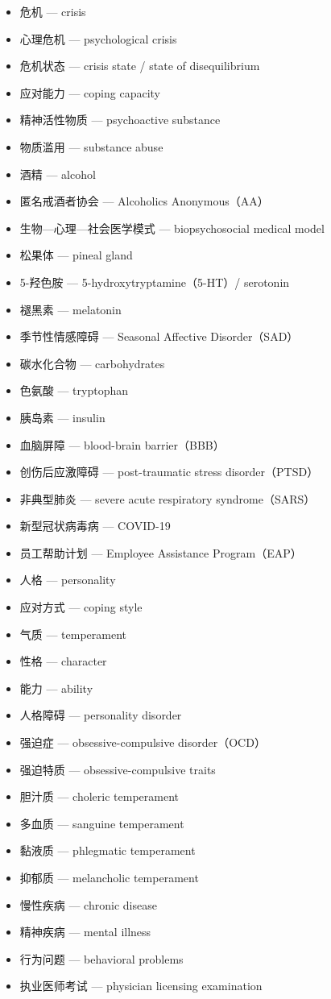\documentclass[
  chinese,
  9pt,
  a4paper,
]{ctexart}
\providecommand{\tightlist}{%
  \setlength{\itemsep}{0pt}\setlength{\parskip}{0pt}}
\begin{document}
\begin{itemize}
\tightlist
\item
  危机 --- crisis
\item
  心理危机 --- psychological crisis
\item
  危机状态 --- crisis state / state of disequilibrium
\item
  应对能力 --- coping capacity
\item
  精神活性物质 --- psychoactive substance
\item
  物质滥用 --- substance abuse
\item
  酒精 --- alcohol
\item
  匿名戒酒者协会 --- Alcoholics Anonymous（AA）
\item
  生物---心理---社会医学模式 --- biopsychosocial medical model
\item
  松果体 --- pineal gland
\item
  5-羟色胺 --- 5-hydroxytryptamine（5-HT）/ serotonin
\item
  褪黑素 --- melatonin
\item
  季节性情感障碍 --- Seasonal Affective Disorder（SAD）
\item
  碳水化合物 --- carbohydrates
\item
  色氨酸 --- tryptophan
\item
  胰岛素 --- insulin
\item
  血脑屏障 --- blood-brain barrier（BBB）
\item
  创伤后应激障碍 --- post-traumatic stress disorder（PTSD）
\item
  非典型肺炎 --- severe acute respiratory syndrome（SARS）
\item
  新型冠状病毒病 --- COVID-19
\item
  员工帮助计划 --- Employee Assistance Program（EAP）
\item
  人格 --- personality
\item
  应对方式 --- coping style
\item
  气质 --- temperament
\item
  性格 --- character
\item
  能力 --- ability
\item
  人格障碍 --- personality disorder
\item
  强迫症 --- obsessive-compulsive disorder（OCD）
\item
  强迫特质 --- obsessive-compulsive traits
\item
  胆汁质 --- choleric temperament
\item
  多血质 --- sanguine temperament
\item
  黏液质 --- phlegmatic temperament
\item
  抑郁质 --- melancholic temperament
\item
  慢性疾病 --- chronic disease
\item
  精神疾病 --- mental illness
\item
  行为问题 --- behavioral problems
\item
  执业医师考试 --- physician licensing examination
\end{itemize}
\end{document}
